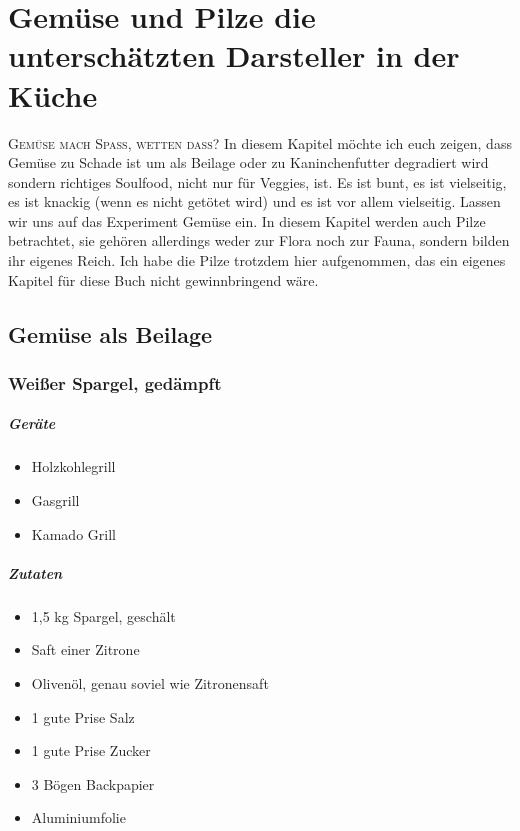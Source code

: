 \chapter{Gemüse und Pilze die unterschätzten Darsteller in der Küche}\label{Chapter3}

\lettrine[lines=3]{G}{emüse mach Spass, wetten dass?} In diesem Kapitel möchte ich euch zeigen, dass Gemüse zu Schade ist um als Beilage oder zu Kaninchenfutter degradiert wird sondern richtiges Soulfood, nicht nur für Veggies, ist. Es ist bunt, es ist vielseitig, es ist knackig (wenn es nicht getötet wird) und es ist vor allem vielseitig. Lassen wir uns auf das Experiment Gemüse ein.  In diesem Kapitel werden auch Pilze betrachtet, sie gehören allerdings weder zur Flora noch zur Fauna, sondern bilden ihr eigenes Reich. Ich habe die Pilze trotzdem hier aufgenommen, das ein eigenes Kapitel für diese Buch nicht gewinnbringend wäre.

\section{Gemüse als Beilage}

\subsection{Weißer Spargel, gedämpft}

\paragraph{Geräte}

\begin{itemize}[noitemsep]
	\item Holzkohlegrill
	\item Gasgrill
	\item Kamado Grill
\end{itemize}

\paragraph{Zutaten}

\begin{itemize}[noitemsep]
	\item 1,5 kg Spargel, geschält
	\item Saft einer Zitrone
	\item Olivenöl, genau soviel wie Zitronensaft
	\item 1 gute Prise Salz
	\item 1 gute Prise Zucker
	\item 3 Bögen Backpapier
	\item Aluminiumfolie
\end{itemize}
	
